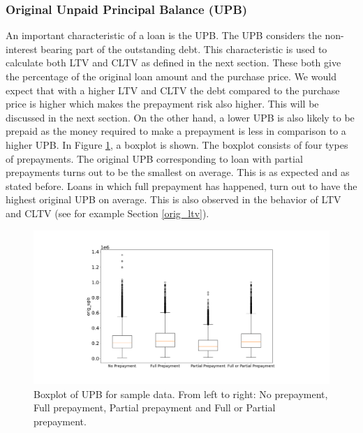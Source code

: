     \subsubsection{Original Unpaid Principal Balance (UPB)}\label{upb}
        An important characteristic of a loan is the UPB.
        The UPB considers the non-interest bearing part of the 
        outstanding debt.  
        This characteristic is used to calculate both LTV and CLTV as defined in the next section. These both give the percentage of the original loan amount and the purchase price. We would expect that with a higher LTV and CLTV the debt compared to the purchase price is higher which makes the prepayment risk also higher. This will be discussed in the next section. 
        On the other hand, a lower UPB is also likely to be
        prepaid as the money required to make a prepayment is 
        less in comparison to a higher UPB. In Figure
        \ref{model_boxplot_UPB}, a boxplot is shown. The boxplot
        consists of four types of prepayments. The original UPB corresponding to loan with partial prepayments turns out to be the smallest on average. This is as expected and as stated before. 
        Loans in which full prepayment has happened, turn out to have the highest original UPB on average. This is also 
        observed in the behavior of LTV and CLTV (see 
        for example Section \ref{orig_ltv}). 
        \begin{figure}[H]
            \centering
            \includegraphics[width=\linewidth]{Figures/Boxplot_of_upb_[2013, 2014, 2015, 2016, 2017, 2018, 2019, 2020]_.png}
            \caption{
                Boxplot of UPB for sample data. From left to right: 
                No prepayment, Full prepayment, Partial prepayment 
                and Full or Partial prepayment.
                }
            \label{model_boxplot_UPB}
        \end{figure}
